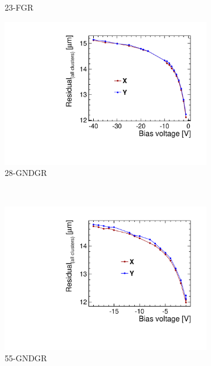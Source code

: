 \begin{figure}[htbp]
\begin{subfigure}[b]{0.33\textwidth}
    \caption{23-FGR}
  \end{subfigure}\hfill
  \begin{subfigure}[b]{0.33\textwidth}
    \includegraphics[width=\textwidth]{./figures/TestBeam/W19_L8_Residual_vs_bias.pdf}
    \caption{28-GNDGR}
  \end{subfigure} \\

  \begin{subfigure}[b]{0.33\textwidth}
    \includegraphics[width=\textwidth]{./figures/TestBeam/W19_C7_Residual_vs_bias.pdf}
    \caption{55-GNDGR}
  \end{subfigure} \hfill
  \begin{subfigure}[b]{0.33\textwidth}


\end{subfigure}
\end{figure}
